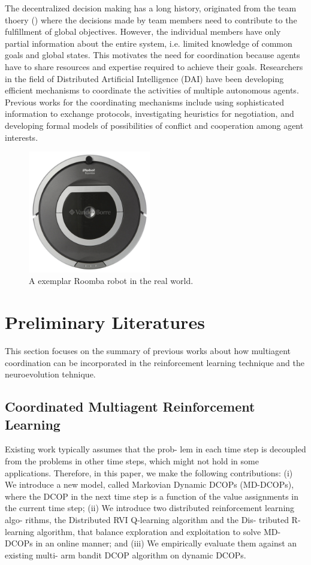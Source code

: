 \documentclass[conference]{IEEEtran}
\begin{document}
The decentralized decision making has a long history, originated from the team
thoery () where the decisions made by team members need to contribute to the
fulfillment of global objectives. However, the individual members have only
partial information about the entire system, i.e. limited knowledge of 
common goals and global states. This motivates the need for coordination
because agents have to share resources and expertise required to achieve their
goals. 
Researchers in the field of Distributed Artificial Intelligence (DAI) have
been developing efficient mechanisms to coordinate the activities of multiple
autonomous agents.
Previous works for the coordinating mechanisms include using sophisticated
information to exchange protocols, investigating heuristics for negotiation,
and developing formal models of possibilities of conflict and cooperation
among agent interests. 

\begin{figure}[!t]
\centering
\includegraphics[width=2.1in,height=2.1in]{./figures/irobot_roomba.jpg}
\caption{A exemplar Roomba robot in the real world.}
\label{roomba:world}
\end{figure}




\section{Preliminary Literatures}
This section focuses on the summary of previous works about how multiagent
coordination can be incorporated in the reinforcement learning technique and the
neuroevolution tehnique.
\subsection{Coordinated Multiagent Reinforcement Learning}
\cite{nguyen2014decentralized} Existing work typically assumes that the prob- lem in each time step is decoupled from the problems in other time steps, which might not hold in some applications. Therefore, in this paper, we make the following contributions: (i) We introduce a new model, called Markovian Dynamic DCOPs (MD-DCOPs), where the DCOP in the next time step is a function of the value assignments in the current time step; (ii) We introduce two distributed reinforcement learning algo- rithms, the Distributed RVI Q-learning algorithm and the Dis- tributed R-learning algorithm, that balance exploration and exploitation to solve MD-DCOPs in an online manner; and (iii) We empirically evaluate them against an existing multi- arm bandit DCOP algorithm on dynamic DCOPs.
\end{document}
